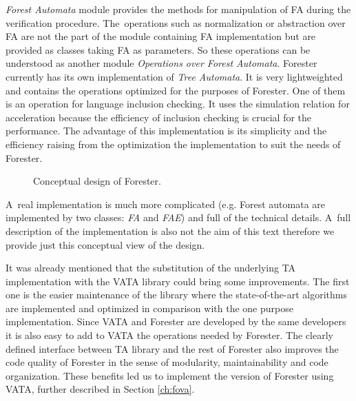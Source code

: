 \emph{Forest Automata} module provides the methods
for manipulation of FA during the verification procedure.
The~operations such as normalization or abstraction over FA are not the part of the module
containing FA implementation but are provided as classes taking FA as parameters.
So these operations can be understood as another module \emph{Operations over Forest Automata}.
Forester currently has its own implementation of \emph{Tree Automata}.
It is very lightweighted and contains the operations optimized
for the purposes of Forester.
One of them is an operation for language inclusion checking.
It uses the simulation relation for acceleration
because the efficiency of inclusion checking is crucial for the performance.
The advantage of this implementation is its simplicity and the efficiency raising
from the optimization the implementation to suit the needs of Forester.

\begin{figure}[bt]
	\begin{center}
		
	\end{center}
	\caption{Conceptual design of Forester.}
	\label{fig:fa_design}
\end{figure}

A~real implementation is much more complicated (e.g. Forest automata are implemented by two classes: \emph{FA} and \emph{FAE})
and full of the technical details.
A~full description of the implementation is also not the aim of this text
therefore we provide just this conceptual view of the design.

It was already mentioned that the substitution of the underlying TA implementation with the
VATA library could bring some improvements.
The first one is the easier maintenance of the library where
the state-of-the-art algorithms are implemented and optimized
in comparison with the one purpose implementation.
Since VATA and Forester are developed by the same developers it is also easy to add
to VATA the operations needed by Forester.
The clearly defined interface between TA library and the rest of Forester
also improves the code quality of Forester in the sense of modularity,
maintainability and code organization.
These benefits led us to implement the version of Forester using VATA,
further described in Section \ref{ch:fova}.


